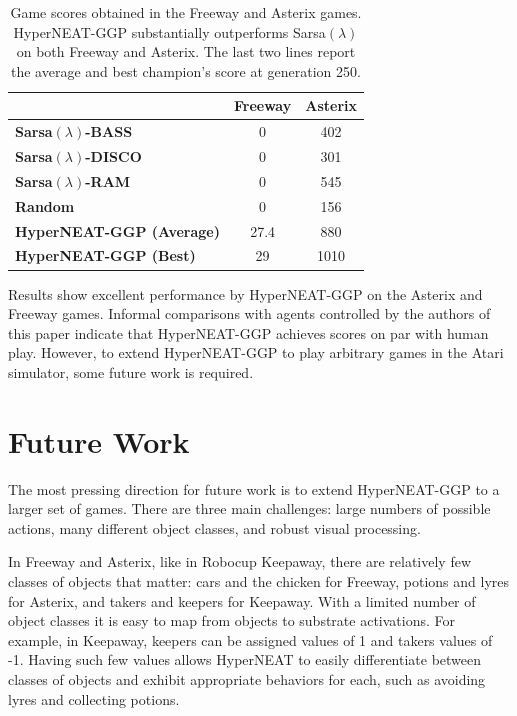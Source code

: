 \documentclass{sig-alternate}
\begin{document}
\begin{table}
\begin{center}
\begin{tabular}{|l|c|c|}
\hline
~ & \textbf{Freeway} & \textbf{Asterix} \\ \hline
\textbf{Sarsa$(\lambda)$-BASS} & 0 & 402 \\ \hline
\textbf{Sarsa$(\lambda)$-DISCO} & 0 & 301 \\ \hline
\textbf{Sarsa$(\lambda)$-RAM} & 0 & 545 \\ \hline
\textbf{Random} & 0 & 156 \\ \hline
\textbf{HyperNEAT-GGP (Average)} & 27.4 & 880 \\ \hline
\textbf{HyperNEAT-GGP (Best)} & 29 & 1010 \\ 
\hline
\end{tabular}
\end{center}
\caption{Game scores obtained in the Freeway and Asterix games. HyperNEAT-GGP substantially outperforms Sarsa$(\lambda)$ on both Freeway and Asterix. The last two lines report the average and best champion's score at generation 250.}
\end{table}

Results show excellent performance by HyperNEAT-GGP on the Asterix and Freeway games. Informal comparisons with agents controlled by the authors of this paper indicate that HyperNEAT-GGP achieves scores on par with human play. However, to extend HyperNEAT-GGP to play arbitrary games in the Atari simulator, some future work is required.

\section{Future Work}
\label{sec:futurework}
The most pressing direction for future work is to extend HyperNEAT-GGP to a larger set of games. There are three main challenges: large numbers of possible actions, many different object classes, and robust visual processing.

In Freeway and Asterix, like in Robocup Keepaway, there are relatively few classes of objects that matter: cars and the chicken for Freeway, potions and lyres for Asterix, and takers and keepers for Keepaway. With a limited number of object classes it is easy to map from objects to substrate activations. For example, in Keepaway, keepers can be assigned values of 1 and takers values of -1. Having such few values allows HyperNEAT to easily differentiate between classes of objects and exhibit appropriate behaviors for each, such as avoiding lyres and collecting potions.
\end{document}
